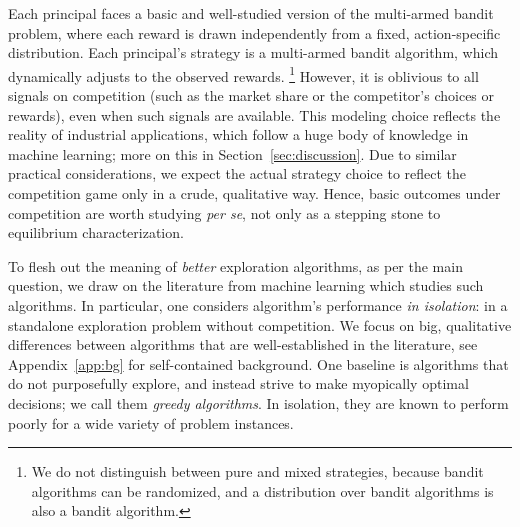 
Each principal faces a basic and well-studied version of the multi-armed bandit problem, where each reward is drawn independently from a fixed, action-specific distribution. Each principal's strategy is a multi-armed bandit algorithm, 
which dynamically adjusts to the observed rewards.%
\footnote{We do not distinguish between pure and mixed strategies, because bandit algorithms can be randomized, and a distribution over bandit algorithms is also a bandit algorithm.}
However, it is oblivious to all signals on competition (such as the market share or the competitor's choices or rewards), even when such signals are available.
This modeling choice reflects the reality of industrial applications, which follow a huge body of knowledge in machine learning; more on this in Section~\ref{sec:discussion}. 
Due to similar practical considerations, we expect the actual strategy choice to reflect the competition game only in a crude, qualitative way. Hence,  basic outcomes under competition are worth studying \emph{per se}, not only as a stepping stone to equilibrium characterization.

To flesh out the meaning of \emph{better} exploration algorithms, as per the main question, we draw on the literature from machine learning which studies such algorithms. In particular, one considers algorithm's performance \emph{in isolation}: in a standalone exploration problem without competition. We focus on big, qualitative differences between algorithms that are well-established in the literature, see Appendix~\ref{app:bg} for self-contained background.
One baseline is algorithms that do not purposefully explore, and instead strive to make myopically optimal decisions; we call them \emph{greedy algorithms}. In isolation, they are known to perform poorly for a wide variety of problem instances.

